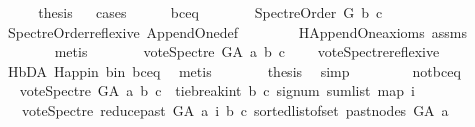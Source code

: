 \begin{isabellebody}
\ \ \isamarkupfalse%
\ \isamarkupfalse%
\ {\isacharquery}{\kern0pt}thesis\isanewline
\ \ \isamarkupfalse%
{\isacharparenleft}{\kern0pt}cases{\isacharparenright}{\kern0pt}\isanewline
\ \ \ \ \isamarkupfalse%
\ b{\isacharunderscore}{\kern0pt}c{\isacharunderscore}{\kern0pt}eq\isanewline
\ \ \ \ \isamarkupfalse%
\ \isamarkupfalse%
\ {\isachardoublequoteopen}Spectre{\isacharunderscore}{\kern0pt}Order\ G\ b\ c{\isachardoublequoteclose}\ \isamarkupfalse%
\ Spectre{\isacharunderscore}{\kern0pt}Order{\isacharunderscore}{\kern0pt}reflexive\ Append{\isacharunderscore}{\kern0pt}One{\isacharunderscore}{\kern0pt}def\isanewline
\ \ \ \ \ \ \ \ H{\isachardot}{\kern0pt}Append{\isacharunderscore}{\kern0pt}One{\isacharunderscore}{\kern0pt}axioms\ assms\isanewline
\ \ \ \ \ \ \isamarkupfalse%
\ metis\isanewline
\ \ \ \ \isamarkupfalse%
\ \isamarkupfalse%
\ {\isachardoublequoteopen}vote{\isacharunderscore}{\kern0pt}Spectre\ G{\isacharunderscore}{\kern0pt}A\ a\ b\ c\ {\isacharequal}{\kern0pt}\ {}{\isachardoublequoteclose}\ \isamarkupfalse%
\ vote{\isacharunderscore}{\kern0pt}Spectre{\isacharunderscore}{\kern0pt}reflexive\ \isanewline
\ \ \ \ \ \ \isamarkupfalse%
\ H{\isachardot}{\kern0pt}bD{\isacharunderscore}{\kern0pt}A\ H{\isachardot}{\kern0pt}app{\isacharunderscore}{\kern0pt}in\ b{\isacharunderscore}{\kern0pt}in\ b{\isacharunderscore}{\kern0pt}c{\isacharunderscore}{\kern0pt}eq\ \isamarkupfalse%
\ metis\isanewline
\ \ \ \ \isamarkupfalse%
\ \isamarkupfalse%
\ {\isacharquery}{\kern0pt}thesis\ \isamarkupfalse%
\ simp\isanewline
\ \ \isamarkupfalse%
\isanewline
\ \ \ \ \isamarkupfalse%
\ not{\isacharunderscore}{\kern0pt}b{\isacharunderscore}{\kern0pt}c{\isacharunderscore}{\kern0pt}eq\isanewline
\ \ \ \ \isamarkupfalse%
\ \isamarkupfalse%
\ {\isachardoublequoteopen}vote{\isacharunderscore}{\kern0pt}Spectre\ G{\isacharunderscore}{\kern0pt}A\ a\ b\ c\ {\isacharequal}{\kern0pt}\ {\isacharparenleft}{\kern0pt}tie{\isacharunderscore}{\kern0pt}break{\isacharunderscore}{\kern0pt}int\ b\ c\ {\isacharparenleft}{\kern0pt}signum\ {\isacharparenleft}{\kern0pt}sum{\isacharunderscore}{\kern0pt}list\ {\isacharparenleft}{\kern0pt}map\ {\isacharparenleft}{\kern0pt}{\isasymlambda}i{\isachardot}{\kern0pt}\isanewline
\ \ \ {\isacharparenleft}{\kern0pt}vote{\isacharunderscore}{\kern0pt}Spectre\ {\isacharparenleft}{\kern0pt}reduce{\isacharunderscore}{\kern0pt}past\ G{\isacharunderscore}{\kern0pt}A\ a{\isacharparenright}{\kern0pt}\ i\ b\ c{\isacharparenright}{\kern0pt}{\isacharparenright}{\kern0pt}\ {\isacharparenleft}{\kern0pt}sorted{\isacharunderscore}{\kern0pt}list{\isacharunderscore}{\kern0pt}of{\isacharunderscore}{\kern0pt}set\ {\isacharparenleft}{\kern0pt}past{\isacharunderscore}{\kern0pt}nodes\ G{\isacharunderscore}{\kern0pt}A\ a{\isacharparenright}{\kern0pt}{\isacharparenright}{\kern0pt}{\isacharparenright}{\kern0pt}{\isacharparenright}{\kern0pt}{\isacharparenright}{\kern0pt}{\isacharparenright}{\kern0pt}{\isachardoublequoteclose}\isanewline

\end{isabellebody}
